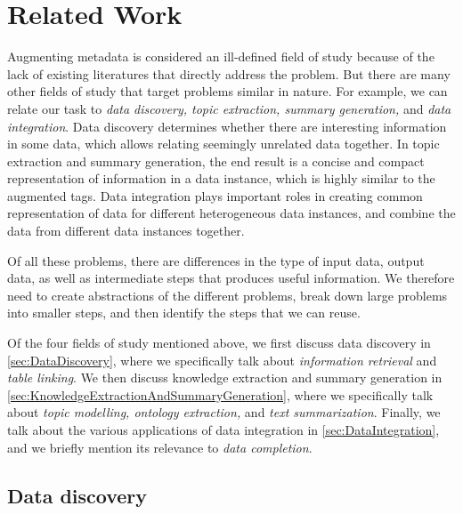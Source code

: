 
\chapter{Related Work}
\label{ch:RelatedWork}

Augmenting metadata is considered an ill-defined field of study because of the lack of existing literatures that directly address the problem. But there are many other fields of study that target problems similar in nature. For example, we can relate our task to \textit{data discovery, topic extraction, summary generation,} and \textit{data integration}. Data discovery determines whether there are interesting information in some data, which allows relating seemingly unrelated data together. In topic extraction and summary generation, the end result is a concise and compact representation of information in a data instance, which is highly similar to the augmented tags. Data integration plays important roles in creating common representation of data for different heterogeneous data instances, and combine the data from different data instances together.

Of all these problems, there are differences in the type of input data, output data, as well as intermediate steps that produces useful information. We therefore need to create abstractions of the different problems, break down large problems into smaller steps, and then identify the steps that we can reuse.

Of the four fields of study mentioned above, we first discuss data discovery in \autoref{sec:DataDiscovery}, where we specifically talk about \textit{information retrieval} and \textit{table linking}. We then discuss knowledge extraction and summary generation in \autoref{sec:KnowledgeExtractionAndSummaryGeneration}, where we specifically talk about \textit{topic modelling, ontology extraction,} and \textit{text summarization}. Finally, we talk about the various applications of data integration in \autoref{sec:DataIntegration}, and we briefly mention its relevance to \textit{data completion}.

\section{Data discovery}
\label{sec:DataDiscovery}


